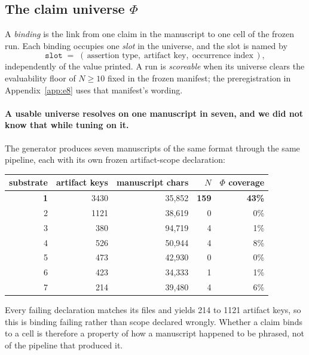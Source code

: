 \documentclass[10pt]{article}
\newcommand{\RM}[1]{{#1}}
\begin{document}
\subsection{The claim universe $\Phi$}
\label{sec:phi}

A \emph{binding} is the link from one claim in the manuscript to one cell of the
frozen run. Each binding occupies one \emph{slot} in the universe, and the slot
is named by
\[
  \texttt{slot} \;=\; (\,\text{assertion type},\; \text{artifact key},\;
  \text{occurrence index}\,),
\]
independently of the value printed. A run is \emph{scoreable} when its universe
clears the evaluability floor of $N \geq \RM{10}$ fixed in the frozen manifest;
the preregistration in Appendix~\ref{app:e8} uses that manifest's wording.

\paragraph{A usable universe resolves on one manuscript in seven, and we did not
know that while tuning on it.} The generator produces seven manuscripts of the
same format through the same pipeline, each with its own frozen artifact-scope
declaration:

\begin{center}
\small
\begin{tabular}{@{}rrrrr@{}}
\toprule
substrate & artifact keys & manuscript chars & $N$ & $\Phi$ coverage \\
\midrule
\textbf{1} & \RM{3430} & \RM{35{,}852} & \RM{\textbf{159}} & \RM{\textbf{43\%}} \\
2 & \RM{1121} & \RM{38{,}619} & \RM{0} & \RM{0\%} \\
3 & \RM{380}  & \RM{94{,}719} & \RM{4} & \RM{1\%} \\
4 & \RM{526}  & \RM{50{,}944} & \RM{4} & \RM{8\%} \\
5 & \RM{473}  & \RM{42{,}930} & \RM{0} & \RM{0\%} \\
6 & \RM{423}  & \RM{34{,}333} & \RM{1} & \RM{1\%} \\
7 & \RM{214}  & \RM{39{,}480} & \RM{4} & \RM{6\%} \\
\bottomrule
\end{tabular}
\end{center}

\noindent Every failing declaration matches its files and yields \RM{214} to
\RM{1121} artifact keys, so this is binding failing rather than scope declared
wrongly. Whether a claim binds to a cell is therefore a property of how a
manuscript happened to be phrased, not of the pipeline that produced it.
\end{document}
